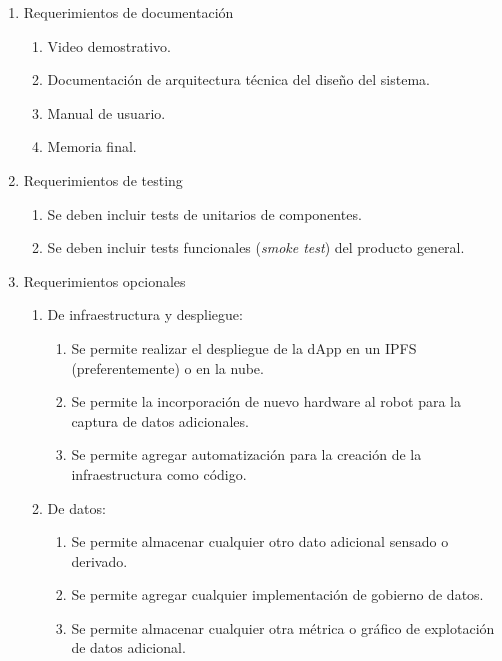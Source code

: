 \begin{enumerate}
	\item Requerimientos de documentación		
		\begin{enumerate}			
			\item Video demostrativo.	
			\item Documentación de arquitectura técnica del diseño del sistema.			
			\item Manual de usuario.	
			\item Memoria final.	
		\end{enumerate}	
		

		
		
	\item Requerimientos de testing		
		\begin{enumerate}			
			\item Se deben incluir tests de unitarios de componentes.
			\item Se deben incluir tests funcionales (\textit{smoke test}) del producto general.		
		\end{enumerate}	
	
	\item Requerimientos opcionales		
		\begin{enumerate}			
			\item De infraestructura y despliegue:
				\begin{enumerate}			
					\item Se permite realizar el despliegue de la dApp en un IPFS (preferentemente) o en la nube.					
					\item Se permite la incorporación de nuevo hardware al robot para la captura de datos adicionales.
					\item Se permite agregar automatización para la creación de la infraestructura como código.
				\end{enumerate}			
			
			\item De datos:
				\begin{enumerate}			
					\item Se permite almacenar cualquier otro dato adicional sensado o derivado.
					\item Se permite agregar cualquier implementación de gobierno de datos.	
					\item Se permite almacenar cualquier otra métrica o gráfico de explotación de datos adicional.
				\end{enumerate}
		
	\end{enumerate}
\end{enumerate}